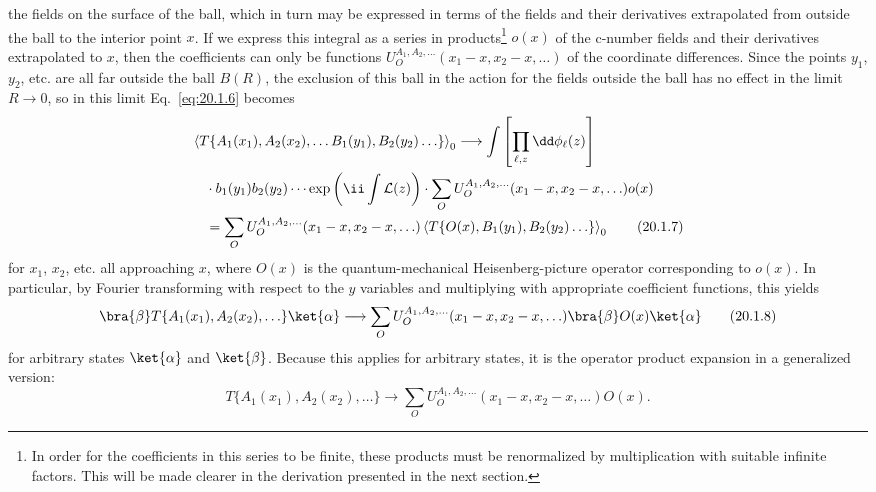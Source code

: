 the fields on the surface of the ball, which in turn may be expressed in
terms of the fields and their derivatives extrapolated from outside the ball
to the interior point $x$. If we express this integral as a series in
products\footnote{In order for the coefficients in this series to be finite,
these products must be renormalized by multiplication with suitable infinite
factors. This will be made clearer in the derivation presented in the next
section.} $o(x)$ of the c-number fields and their derivatives extrapolated
to $x$, then the coefficients can only be functions
$U_O^{A_1,A_2,\ldots}(x_1-x,x_2-x,\ldots)$ of the coordinate differences.
Since the points $y_1$, $y_2$, etc. are all far outside the ball $B(R)$, the
exclusion of this ball in the action for the fields outside the ball has no
effect in the limit $R\to0$, so in this limit Eq.~\eqref{eq:20.1.6} becomes
\begin{align}
 &\left\langle
 T\{A_1(x_1),A_2(x_2),\ldots B_1(y_1),B_2(y_2)\ldots\}
 \right\rangle_0
 \longrightarrow
 \int\left[\prod_{\ell,z}\dd\phi_\ell(z)\right]
 \notag\\
 &\quad{}\cdot b_1(y_1)b_2(y_2)\cdots
 \exp\left(\ii\int\mathcal L(z)\right)
 \cdot\sum_O
 U_O^{A_1,A_2,\ldots}(x_1-x,x_2-x,\ldots)o(x)
 \notag\\
 &\quad{}=
 \sum_O U_O^{A_1,A_2,\ldots}(x_1-x,x_2-x,\ldots)
 \left\langle
 T\{O(x),B_1(y_1),B_2(y_2)\ldots\}
 \right\rangle_0
 \tag{20.1.7}\label{eq:20.1.7}
\end{align}
for $x_1$, $x_2$, etc. all approaching $x$, where $O(x)$ is the
quantum-mechanical Heisenberg-picture operator corresponding to $o(x)$. In
particular, by Fourier transforming with respect to the $y$ variables and
multiplying with appropriate coefficient functions, this yields
\begin{equation}
 \bra{\beta}T\{A_1(x_1),A_2(x_2),\ldots\}\ket{\alpha}
 \longrightarrow
 \sum_O U_O^{A_1,A_2,\ldots}(x_1-x,x_2-x,\ldots)
 \bra{\beta}O(x)\ket{\alpha}
 \tag{20.1.8}\label{eq:20.1.8}
\end{equation}
for arbitrary states $\ket{\alpha}$ and $\ket{\beta}$. Because this applies
for arbitrary states, it is the operator product expansion in a generalized
version:
\begin{equation}
 T\{A_1(x_1),A_2(x_2),\ldots\}
 \longrightarrow
 \sum_O U_O^{A_1,A_2,\ldots}(x_1-x,x_2-x,\ldots)O(x).
 \tag{20.1.9}\label{eq:20.1.9}
\end{equation}
